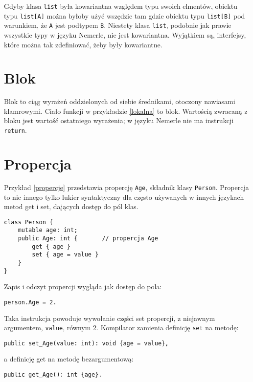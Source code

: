 \documentclass[a4paper,12pt]{mwbk}
\begin{document}
Gdyby klasa \lstinline!list! była kowariantna względem typu swoich elmentów,
obiektu typu \lstinline!list[A]! można byłoby użyć wszędzie tam gdzie obiektu
typu \lstinline!list[B]! pod warunkiem, że \lstinline!A! jest podtypem
\lstinline!B!. Niestety klasa \lstinline!list!, podobnie jak prawie wszystkie
typy w języku Nemerle, nie jest kowariantna. Wyjątkiem są, interfejsy, które
można tak zdefiniować, żeby były kowariantne.


\section{Blok}

Blok to ciąg wyrażeń oddzielonych od siebie średnikami, otoczony
nawiasami klamrowymi. Ciało funkcji w przykładzie \ref{lokalna} to blok.
Wartością zwracaną z bloku jest wartość ostatniego wyrażenia; w języku Nemerle
nie ma instrukcji \lstinline!return!.

\section{Propercja}\label{propercja}

Przykład \ref{propercje} przedstawia propercję \lstinline!Age!, składnik klasy 
\lstinline!Person!. Propercja to nic innego tylko lukier syntaktyczny dla
często używanych w innych językach metod get i set, dających dostęp do pól klas.

\begin{lstlisting}[style=AspectJ,caption=Propercja w języku Nemerle,label=propercje]
class Person {
    mutable age: int;
    public Age: int {       // propercja Age
        get { age }
        set { age = value }
    }
}
\end{lstlisting}

Zapis i odczyt propercji wygląda jak dostęp do pola: 
\begin{lstlisting}[style=AspectJ]
person.Age = 2.
\end{lstlisting}
Taka instrukcja powoduje wywołanie części set propercji, z niejawnym argumentem, \lstinline!value!,
równym 2. Kompilator zamienia definicję \lstinline!set! na metodę:
\begin{lstlisting}[style=AspectJ]
public set_Age(value: int): void {age = value},
\end{lstlisting}
a definicję get na metodę bezargumentową:
\begin{lstlisting}[style=AspectJ]
public get_Age(): int {age}.
\end{lstlisting}
\end{document}
